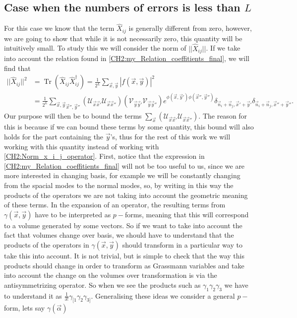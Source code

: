 \subsection{Case when the numbers of errors is less than $L$}
For this case we know that the term $\hat{X}_{ij}$ is generally different from zero, however, we are going to show that while it is not necessarily zero, this quantity will be intuitively small. To study this we will consider the norm of $||\hat{X}_{ij}||$. If we take into account the relation found in \eqref{CH2:my_Relation_coeffitients_final}, we will find that
\begin{equation}
\begin{aligned}
||\hat{X}_{ij}||^{2}&=\operatorname{Tr}\left(\hat{X}_{ij} \hat{X}^{\dagger}_{ij}\right) = \frac{1}{2^L}\sum_{\vec{x},\vec{y}}|f(\vec{x},\vec{y})|^2\\
&=\frac{1}{2^L}\underset{\vec{x}'',\vec{y}''}{\sum_{\vec{x},\vec{y}}}\left(	\mathcal{U}_{\vec{x}\vec{x}'} \mathcal{U}_{\vec{x}\vec{x}''}\right) \left(	\mathcal{V}_{\vec{y}\vec{y}'} \mathcal{V}_{\vec{y}\vec{y}''}\right) e^{\phi(\vec{x},\vec{y}')\phi(\vec{x}'',\vec{y}'')}\delta_{\vec{n}_i+\vec{n}_j,\vec{x}'+\vec{y}'}\delta_{\vec{n}_i+\vec{n}_j,\vec{x}''+\vec{y}''}.
\end{aligned}
\label{CH2:Norm_x_i_j_operator}
\end{equation}
\indent Our purpose will then be to bound the terms $\sum_{\vec{x}}\left(	\mathcal{U}_{\vec{x}\vec{x}'} \mathcal{U}_{\vec{x}\vec{x}''}\right)$. The reason for this is because if we can bound these terms by some quantity, this bound will also holds for the part containing the $\vec{y}$'s, thus for the rest of this work we will working with this quantity instead of working with \eqref{CH2:Norm_x_i_j_operator}. First, notice that the expression in \eqref{CH2:my_Relation_coeffitients_final} will not be too useful to us, since we are more interested in changing basis, for example we will be constantly changing from the spacial modes to the normal modes, so, by writing in this way the products of the operators we are not taking into account the geometric meaning of these terms. In the expansion of an operator, the resulting terms from $\gamma(\vec{x},\vec{y})$ have to be interpreted as $p-$forms, meaning that this will correspond to a volume generated by some vectors. So if we want to take into account the fact that volumes change over basis, we should have to understand that the products of the operators in $\gamma(\vec{x},\vec{y})$ should transform in a particular way to take this into account. It is not trivial, but is simple to check that the way this products should change in order to transform as Grassmann variables and take into account the change on the volumes over transformation is via the antisymmetrizing operator. So when we see the products such as $\gamma_{1}\gamma_{2}\gamma_{3}$ we have to understand it as $\frac{1}{3!}\gamma_{[1}\gamma_2\gamma_{3]}$. Generalising these ideas we consider a general $p-$form, lets say $\gamma(\vec{\alpha})$
